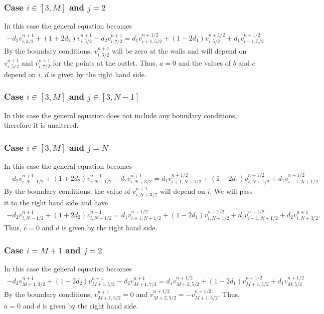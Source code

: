 \subsubsection*{Case $i\in[3,M]$ and $j=2$}
In this case the general equation becomes
\begin{align*}
-d_2v_{i,3/2}^{n+1}+(1+2d_2)v_{i,5/2}^{n+1}-d_2v_{i,7/2}^{n+1}=d_1v_{i+1,5/2}^{n+1/2}+(1-2d_1)v_{i,5/2}^{n+1/2}+d_1v_{i-1,5/2}^{n+1/2}
\end{align*}
By the boundary conditions, $v_{i,3/2}^{n+1}$ will be zero at the walls and will depend on $v_{i,5/2}^{n+1}$ and $v_{i,7/2}^{n+1}$ for the points at the outlet. Thus, $a=0$ and the values of $b$ and $c$ depend on $i$, $d$ is given by the right hand side.

\subsubsection*{Case $i\in[3,M]$ and $j\in[3,N-1]$}
In this case the general equation does not include any boundary conditions, therefore it is unaltered.

\subsubsection*{Case $i\in[3,M]$ and $j=N$}
In this case the general equation becomes
\begin{align*}
-d_2v_{i,N-1/2}^{n+1}+(1+2d_2)v_{i,N+1/2}^{n+1}-d_2v_{i,N+3/2}^{n+1}=d_1v_{i+1,N+1/2}^{n+1/2}+(1-2d_1)v_{i,N+1/2}^{n+1/2}+d_1v_{i-1,N+1/2}^{n+1/2}
\end{align*}
By the boundary conditions, the value of $v_{i,N+3/2}^{n+1}$ will depend on $i$. We will pass it to the right hand side and have
\begin{align*}
-d_2v_{i,N-1/2}^{n+1}+(1+2d_2)v_{i,N+1/2}^{n+1}=d_1v_{i+1,N+1/2}^{n+1/2}+(1-2d_1)v_{i,N+1/2}^{n+1/2}+d_1v_{i-1,N+1/2}^{n+1/2}+d_2v_{i,N+3/2}^{n+1}.
\end{align*}
Thus, $c=0$ and $d$ is given by the right hand side.

\subsubsection*{Case $i=M+1$ and $j=2$}
In this case the general equation becomes
\begin{align*}
-d_2v_{M+1,3/2}^{n+1}+(1+2d_2)v_{M+1,5/2}^{n+1}-d_2v_{M+1,7/2}^{n+1}=d_1v_{M+2,5/2}^{n+1/2}+(1-2d_1)v_{M+1,5/2}^{n+1/2}+d_1v_{M,5/2}^{n+1/2}
\end{align*}
By the boundary conditions, $v_{M+1,3/2}^{n+1}=0$ and $v_{M+2,5/2}^{n+1/2}=-v_{M+1,5/2}^{n+1/2}$. Thus, $a=0$ and $d$ is given by the right hand side.

